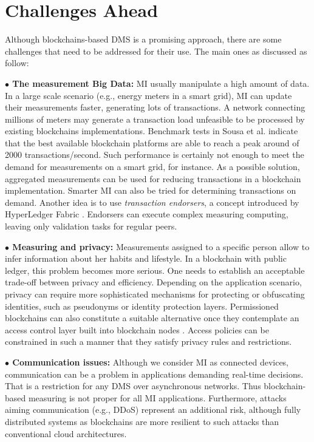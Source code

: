\documentclass[conference]{IEEEtran}
\begin{document}
\section{Challenges Ahead}
Although blockchains-based DMS is a promising approach, there are some challenges that need to be addressed for their use. The main ones as discussed as follow:

\textbf{$\bullet$ The measurement Big Data:} MI usually manipulate a high amount of data. In a large scale scenario (e.g., energy meters in a smart grid), MI can update their measurements faster, generating lots of transactions. A network connecting millions of meters may generate a transaction load unfeasible to be processed by existing blockchains implementations. Benchmark tests in Sousa et al. \cite{Sousa2017} indicate that the best available blockchain platforms are able to reach a peak around of 2000 transactions/second. Such performance is certainly not enough to meet the demand for measurements on a smart grid, for instance. As a possible solution, aggregated measurements can be used for reducing transactions in a blockchain implementation. Smarter MI can also be tried for determining transactions on demand. Another idea is to use \emph{transaction endorsers}, a concept introduced by HyperLedger Fabric \cite{Vukolic2017a,Sousa2017}. Endorsers can execute complex measuring computing, leaving only validation tasks for regular peers.

\textbf{$\bullet$ Measuring and privacy:} Measurements assigned to a specific person allow to infer information about her habits and lifestyle. In a blockchain with public ledger, this problem becomes more serious. One needs to establish an acceptable trade-off between privacy and efficiency. Depending on the application scenario, privacy can require more sophisticated mechanisms for protecting or obfuscating identities, such as pseudonyms or identity protection layers. Permissioned blockchains can also constitute a suitable alternative once they contemplate an access control layer built into blockchain nodes \cite{Vukolic2017a,Vukolic2016}. Access policies can be constrained in such a manner that they satisfy privacy rules and restrictions.

\textbf{$\bullet$ Communication issues:} Although we consider MI as connected devices, communication can be a problem in applications demanding real-time decisions. That is a restriction for any DMS over asynchronous networks. Thus blockchain-based measuring is not proper for all MI applications. Furthermore, attacks aiming communication (e.g., DDoS) represent an additional risk, although fully distributed systems as blockchains are more resilient to such attacks than conventional cloud architectures.
\end{document}
